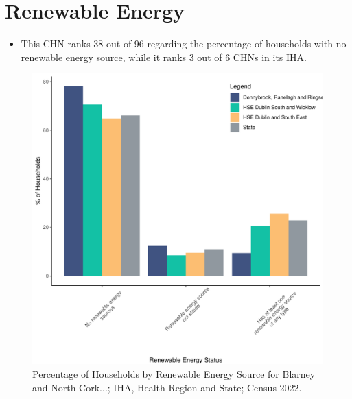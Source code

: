 \documentclass{article}
\begin{document}
\section{Renewable Energy}\label{sect:RE}
\begin{itemize}
\item This CHN ranks  38 out of 96 regarding the percentage of households with no renewable energy source, while it ranks   3 out of 6 CHNs in its IHA.
\end{itemize}
\begin{figure}[H]
	\centering
	\includegraphics[width = 140mm]{../figures/RenewableEnergyED.pdf}
	\caption{Percentage of Households by Renewable Energy Source for Blarney and North Cork...; IHA, Health Region and State; Census 2022.}
	\label{fig:vbnv}
	\end{figure}
\end{document}
